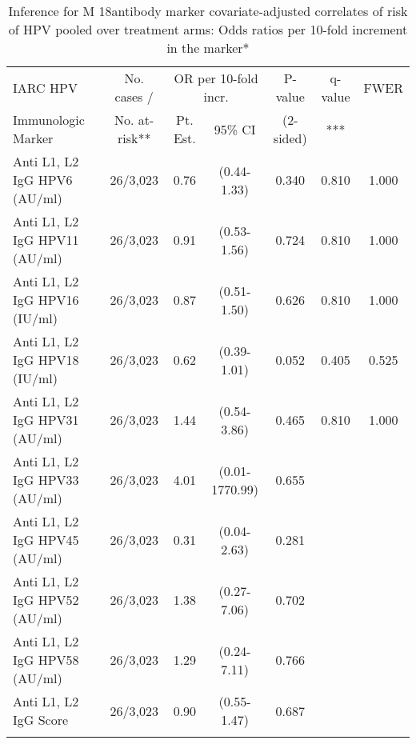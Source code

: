 \begin{longtable}{lcccccc}
\caption{Inference for M 18antibody marker covariate-adjusted correlates of risk of HPV pooled over treatment arms: Odds ratios per 10-fold increment in the marker*} \\ 
   \hline
 
         \multicolumn{1}{l}{IARC HPV} & \multicolumn{1}{c}{No. cases /}   & \multicolumn{2}{c}{OR per 10-fold incr.}                     & \multicolumn{1}{c}{P-value}   & \multicolumn{1}{c}{q-value}   & \multicolumn{1}{c}{FWER} \\ 
         \multicolumn{1}{l}{Immunologic Marker}            & \multicolumn{1}{c}{No. at-risk**} & \multicolumn{1}{c}{Pt. Est.} & \multicolumn{1}{c}{95\% CI} & \multicolumn{1}{c}{(2-sided)} & \multicolumn{1}{c}{***} & \multicolumn{1}{c}{} \\ 
         \hline
 
    Anti L1, L2 IgG HPV6 (AU/ml) & 26/3,023 & 0.76 & (0.44-1.33) & 0.340 & 0.810 & 1.000 \\ 
  Anti L1, L2 IgG HPV11 (AU/ml) & 26/3,023 & 0.91 & (0.53-1.56) & 0.724 & 0.810 & 1.000 \\ 
  Anti L1, L2 IgG HPV16 (IU/ml) & 26/3,023 & 0.87 & (0.51-1.50) & 0.626 & 0.810 & 1.000 \\ 
  Anti L1, L2 IgG HPV18 (IU/ml) & 26/3,023 & 0.62 & (0.39-1.01) & 0.052 & 0.405 & 0.525 \\ 
  Anti L1, L2 IgG HPV31 (AU/ml) & 26/3,023 & 1.44 & (0.54-3.86) & 0.465 & 0.810 & 1.000 \\ 
  Anti L1, L2 IgG HPV33 (AU/ml) & 26/3,023 & 4.01 & (0.01-1770.99) & 0.655 &     &     \\ 
  Anti L1, L2 IgG HPV45 (AU/ml) & 26/3,023 & 0.31 & (0.04-2.63) & 0.281 &     &     \\ 
  Anti L1, L2 IgG HPV52 (AU/ml) & 26/3,023 & 1.38 & (0.27-7.06) & 0.702 &     &     \\ 
  Anti L1, L2 IgG HPV58 (AU/ml) & 26/3,023 & 1.29 & (0.24-7.11) & 0.766 &     &     \\ 
  Anti L1, L2 IgG Score & 26/3,023 & 0.90 & (0.55-1.47) & 0.687 &     &     \\ 
   \hline
\hline
\label{tab:CoR_univariable_logistic_pretty}
\end{longtable}
